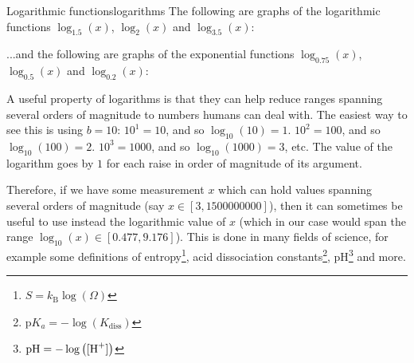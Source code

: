 \begin{example}{Logarithmic functions}{logarithms}
	The following are graphs of the logarithmic functions \textcolor{xred}{${\log_{1.5}(x)}$}, \textcolor{xblue}{${\log_{2}(x)}$} and \textcolor{xgreen}{${\log_{3.5}(x)}$}:
	\begin{figure}[H]
		\centering
	\end{figure}

	...and the following are graphs of the exponential functions \textcolor{xpurple}{$\log_{0.75}(x)$}, \textcolor{xorange}{$\log_{0.5}(x)$} and $\log_{0.2}(x)$:
	\begin{figure}[H]
		\centering
	\end{figure}
\end{example}

A useful property of logarithms is that they can help reduce ranges spanning several orders of magnitude to numbers humans can deal with. The easiest way to see this is using $b=10$: $10^{1}=10$, and so $\log_{10}(10)=1$. $10^{2}=100$, and so $\log_{10}(100)=2$. $10^{3}=1000$, and so $\log_{10}(1000)=3$, etc. The value of the logarithm goes by $1$ for each raise in order of magnitude of its argument.

Therefore, if we have some measurement $x$ which can hold values spanning several orders of magnitude (say $x\in[3,1500000000]$), then it can sometimes be useful to use instead the logarithmic value of $x$ (which in our case would span the range $\log_{10}(x)\in[0.477,9.176]$). This is done in many fields of science, for example some definitions of entropy\footnote{$S=k_{\text{B}}\log\left( \Omega \right)$}, acid dissociation constants\footnote{$\text{p}K_{a}=-\log\left( K_{\text{diss}} \right)$}, pH\footnote{$\text{pH}=-\log\left(\ce{[H+]}\right)$} and more.

